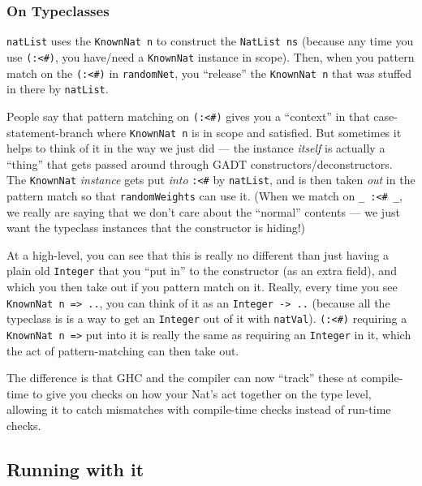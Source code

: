 \documentclass[]{article}
\begin{document}
\subsubsection{On Typeclasses}\label{on-typeclasses}

\texttt{natList} uses the \texttt{KnownNat\ n} to construct the
\texttt{NatList\ ns} (because any time you use
\texttt{(:\textless{}\#)}, you have/need a \texttt{KnownNat} instance in
scope). Then, when you pattern match on the \texttt{(:\textless{}\#)} in
\texttt{randomNet}, you ``release'' the \texttt{KnownNat\ n} that was
stuffed in there by \texttt{natList}.

People say that pattern matching on \texttt{(:\textless{}\#)} gives you
a ``context'' in that case-statement-branch where \texttt{KnownNat\ n}
is in scope and satisfied. But sometimes it helps to think of it in the
way we just did --- the instance \emph{itself} is actually a ``thing''
that gets passed around through GADT constructors/deconstructors. The
\texttt{KnownNat} \emph{instance} gets put \emph{into}
\texttt{:\textless{}\#} by \texttt{natList}, and is then taken
\emph{out} in the pattern match so that \texttt{randomWeights} can use
it. (When we match on \texttt{\_\ :\textless{}\#\ \_}, we really are
saying that we don't care about the ``normal'' contents --- we just want
the typeclass instances that the constructor is hiding!)

At a high-level, you can see that this is really no different than just
having a plain old \texttt{Integer} that you ``put in'' to the
constructor (as an extra field), and which you then take out if you
pattern match on it. Really, every time you see
\texttt{KnownNat\ n\ =\textgreater{}\ ..}, you can think of it as an
\texttt{Integer\ -\textgreater{}\ ..} (because all the typeclass is is a
way to get an \texttt{Integer} out of it with \texttt{natVal}).
\texttt{(:\textless{}\#)} requiring a
\texttt{KnownNat\ n\ =\textgreater{}} put into it is really the same as
requiring an \texttt{Integer} in it, which the act of pattern-matching
can then take out.

The difference is that GHC and the compiler can now ``track'' these at
compile-time to give you checks on how your Nat's act together on the
type level, allowing it to catch mismatches with compile-time checks
instead of run-time checks.

\subsection{Running with it}\label{running-with-it}
\end{document}
